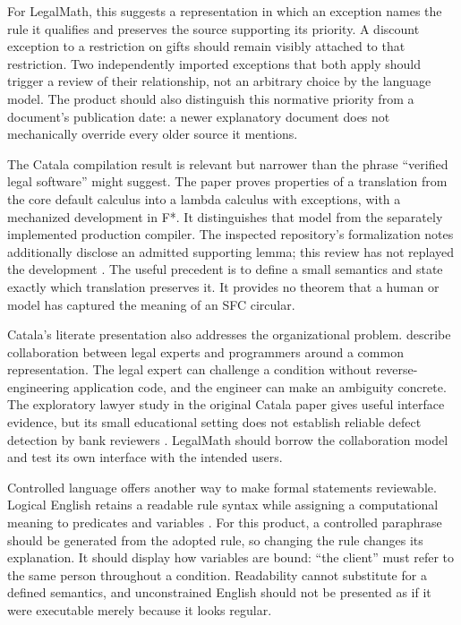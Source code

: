 \documentclass[12pt,a4paper,oneside,openany]{book}
\begin{document}
For LegalMath, this suggests a representation in which an exception names the
rule it qualifies and preserves the source supporting its priority. A discount
exception to a restriction on gifts should remain visibly attached to that
restriction. Two independently imported exceptions that both apply should trigger
a review of their relationship, not an arbitrary choice by the language model.
The product should also distinguish this normative priority from a document's
publication date: a newer explanatory document does not mechanically override
every older source it mentions.

The Catala compilation result is relevant but narrower than the phrase
``verified legal software'' might suggest. The paper proves properties of a
translation from the core default calculus into a lambda calculus with exceptions,
with a mechanized development in F*. It distinguishes that model from the
separately implemented production compiler. The inspected repository's
formalization notes additionally disclose an admitted supporting lemma; this
review has not replayed the development \citep[sec.~4]{catala2021,catalacode}.
The useful precedent is to define a small semantics and state exactly which
translation preserves it. It provides no theorem that a human or model has
captured the meaning of an SFC circular.

Catala's literate presentation also addresses the organizational problem.
\citet[sec.~4.2]{huttner2022} describe collaboration between legal experts and
programmers around a common representation. The legal expert can challenge a
condition without reverse-engineering application code, and the engineer can
make an ambiguity concrete. The exploratory lawyer study in the original Catala
paper gives useful interface evidence, but its small educational setting does
not establish reliable defect detection by bank reviewers
\citep[sec.~6]{catala2021}. LegalMath should borrow the collaboration model and
test its own interface with the intended users.

Controlled language offers another way to make formal statements reviewable.
Logical English retains a readable rule syntax while assigning a computational
meaning to predicates and variables \citep{logicalenglish2023}. For this product,
a controlled paraphrase should be generated from the adopted rule, so changing
the rule changes its explanation. It should display how variables are bound:
``the client'' must refer to the same person throughout a condition. Readability
cannot substitute for a defined semantics, and unconstrained English should not
be presented as if it were executable merely because it looks regular.
\end{document}

